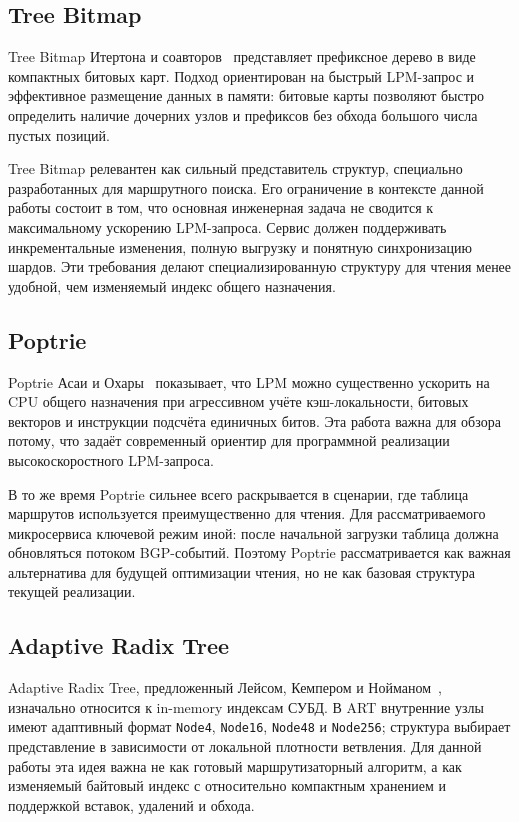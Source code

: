 \subsection{Tree Bitmap}

Tree Bitmap Итертона и соавторов~\cite{eatherton2004treebitmap}
представляет префиксное дерево в виде компактных битовых карт. Подход
ориентирован на быстрый LPM-запрос и эффективное размещение данных в памяти:
битовые карты позволяют быстро определить наличие дочерних узлов и
префиксов без обхода большого числа пустых позиций.

Tree Bitmap релевантен как сильный представитель структур, специально
разработанных для маршрутного поиска. Его ограничение в контексте данной
работы состоит в том, что основная инженерная задача не сводится к
максимальному ускорению LPM-запроса. Сервис должен поддерживать
инкрементальные изменения, полную выгрузку и понятную синхронизацию
шардов. Эти требования делают специализированную структуру для чтения менее
удобной, чем изменяемый индекс общего назначения.

\subsection{Poptrie}

Poptrie Асаи и Охары~\cite{asai2015poptrie} показывает, что LPM можно
существенно ускорить на CPU общего назначения при агрессивном учёте
кэш-локальности, битовых векторов и инструкции подсчёта единичных битов.
Эта работа важна для обзора потому, что задаёт современный ориентир для
программной реализации высокоскоростного LPM-запроса.

В то же время Poptrie сильнее всего раскрывается в сценарии, где таблица
маршрутов используется преимущественно для чтения. Для рассматриваемого
микросервиса ключевой режим иной: после начальной загрузки таблица должна
обновляться потоком BGP-событий. Поэтому Poptrie рассматривается как
важная альтернатива для будущей оптимизации чтения, но не как базовая
структура текущей реализации.

\subsection{Adaptive Radix Tree}

Adaptive Radix Tree, предложенный Лейсом, Кемпером и
Нойманом~\cite{leis2013art}, изначально относится к in-memory индексам
СУБД. В ART внутренние узлы имеют адаптивный формат
\texttt{Node4}, \texttt{Node16}, \texttt{Node48} и \texttt{Node256};
структура выбирает представление в зависимости от локальной плотности
ветвления. Для данной работы эта идея важна не как готовый
маршрутизаторный алгоритм, а как изменяемый байтовый индекс с
относительно компактным хранением и поддержкой вставок, удалений и
обхода.

